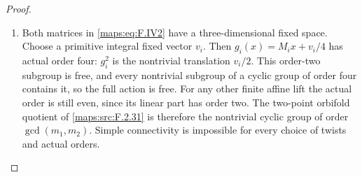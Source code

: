 \documentclass[11pt,a4paper]{article}
\theoremstyle{definition}
\begin{document}
\begin{proof}
\begin{enumerate}[label=\arabic*.]
\item Both matrices in \eqref{maps:eq:F.IV2} have a three-dimensional fixed
space.  Choose a primitive integral fixed vector $v_i$.
Then $g_i(x)=M_ix+v_i/4$ has actual order four:
$g_i^2$ is the nontrivial translation $v_i/2$.
This order-two subgroup is free, and every nontrivial
subgroup of a cyclic group of order four contains it, so
the full action is free.  For any other finite affine lift
the actual order is still even, since its linear part has
order two.  The two-point orbifold quotient of \ref{maps:src:F.2.31} is
therefore the nontrivial cyclic group of order
$\gcd(m_1,m_2)$.  Simple connectivity is impossible for
every choice of twists and actual orders.

\end{enumerate}
\end{proof}
\end{document}
